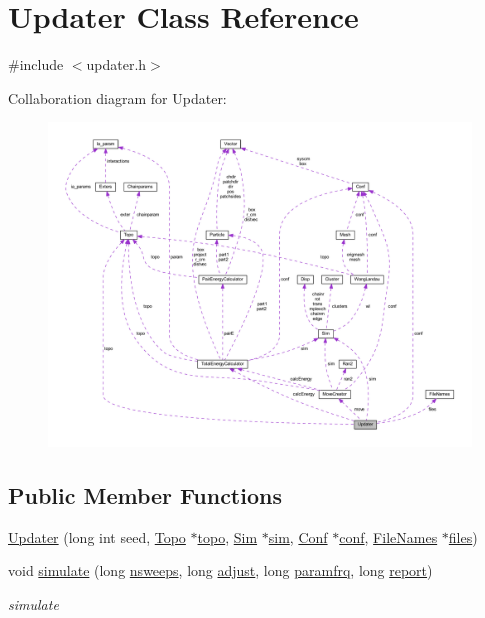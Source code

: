 \hypertarget{class_updater}{\section{Updater Class Reference}
\label{class_updater}
}


{\ttfamily \#include $<$updater.\+h$>$}



Collaboration diagram for Updater\+:\nopagebreak
\begin{figure}[H]
\begin{center}
\leavevmode
\includegraphics[width=350pt]{class_updater__coll__graph}
\end{center}
\end{figure}
\subsection*{Public Member Functions}
\begin{DoxyCompactItemize}
\item 
\hyperlink{class_updater_a53fc3a29ff7b8457744815f77590ba4d}{Updater} (long int seed, \hyperlink{struct_topo}{Topo} $\ast$\hyperlink{class_updater_a2ac7e890d9b19cd1c8074ef5e2b8fd14}{topo}, \hyperlink{struct_sim}{Sim} $\ast$\hyperlink{class_updater_a0436d5371f3fdc707e323b84ea7356fe}{sim}, \hyperlink{class_conf}{Conf} $\ast$\hyperlink{class_updater_a2f0686ac33efa6f1712431b37d0c1ba1}{conf}, \hyperlink{struct_file_names}{File\+Names} $\ast$\hyperlink{class_updater_ab29cd3f9d7d825aa83cd98aa18b53752}{files})
\item 
void \hyperlink{class_updater_a42cde2ba4af4b35d0265a183a42cea20}{simulate} (long \hyperlink{class_updater_aabcc5bfefc334a9514c481f31bcf9c06}{nsweeps}, long \hyperlink{class_updater_af7b8b8f187a21d9683cd4fea2dd5fbd7}{adjust}, long \hyperlink{class_updater_ab992a0a03d5ff6a550596d457e3df5b8}{paramfrq}, long \hyperlink{class_updater_a3dc9b09abafeebacf23cd7c7d17f5655}{report})
\begin{DoxyCompactList}\small\item\em simulate \end{DoxyCompactList}\end{DoxyCompactItemize}
